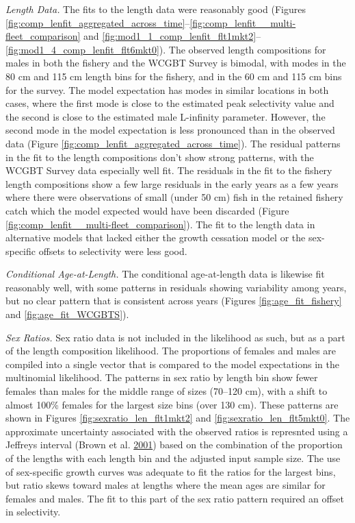 \documentclass[12pt,]{article}
\begin{document}
\emph{Length Data.} The fits to the length data were reasonably good
(Figures
\ref{fig:comp_lenfit_aggregated_across_time}--\ref{fig:comp_lenfit__multi-fleet_comparison}
and
\ref{fig:mod1_1_comp_lenfit_flt1mkt2}--\ref{fig:mod1_4_comp_lenfit_flt6mkt0}).
The observed length compositions for males in both the fishery and the
WCGBT Survey is bimodal, with modes in the 80 cm and 115 cm length bins
for the fishery, and in the 60 cm and 115 cm bins for the survey. The
model expectation has modes in similar locations in both cases, where
the first mode is close to the estimated peak selectivity value and the
second is close to the estimated male L-infinity parameter. However, the
second mode in the model expectation is less pronounced than in the
observed data (Figure \ref{fig:comp_lenfit_aggregated_across_time}). The
residual patterns in the fit to the length compositions don't show
strong patterns, with the WCGBT Survey data especially well fit. The
residuals in the fit to the fishery length compositions show a few large
residuals in the early years as a few years where there were
observations of small (under 50 cm) fish in the retained fishery catch
which the model expected would have been discarded (Figure
\ref{fig:comp_lenfit__multi-fleet_comparison}). The fit to the length
data in alternative models that lacked either the growth cessation model
or the sex-specific offsets to selectivity were less good.

\emph{Conditional Age-at-Length.} The conditional age-at-length data is
likewise fit reasonably well, with some patterns in residuals showing
variability among years, but no clear pattern that is consistent across
years (Figures \ref{fig:age_fit_fishery} and \ref{fig:age_fit_WCGBTS}).

\emph{Sex Ratios.} Sex ratio data is not included in the likelihood as
such, but as a part of the length composition likelihood. The
proportions of females and males are compiled into a single vector that
is compared to the model expectations in the multinomial likelihood. The
patterns in sex ratio by length bin show fewer females than males for
the middle range of sizes (70--120 cm), with a shift to almost 100\%
females for the largest size bins (over 130 cm). These patterns are
shown in Figures \ref{fig:sexratio_len_flt1mkt2} and
\ref{fig:sexratio_len_flt5mkt0}. The approximate uncertainty associated
with the observed ratios is represnted using a Jeffreys interval (Brown
et al. \protect\hyperlink{ref-brown2001interval}{2001}) based on the
combination of the proportion of the lengths with each length bin and
the adjusted input sample size. The use of sex-specific growth curves
was adequate to fit the ratios for the largest bins, but ratio skews
toward males at lengths where the mean ages are similar for females and
males. The fit to this part of the sex ratio pattern required an offset
in selectivity.
\end{document}
